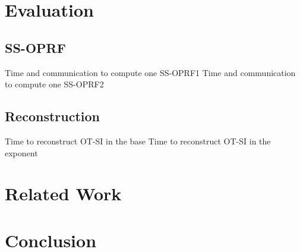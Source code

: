 \documentclass[10pt, sigconf]{acmart}
\begin{document}
\section{Evaluation}

\subsection{SS-OPRF}

Time and communication to compute one SS-OPRF1
Time and communication to compute one SS-OPRF2

\subsection{Reconstruction}

Time to reconstruct OT-SI in the base
Time to reconstruct OT-SI in the exponent

\section{Related Work}


\section{Conclusion}



\end{document}
